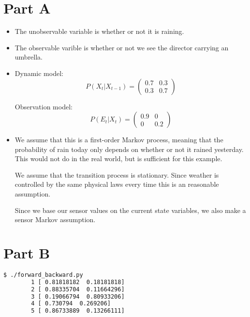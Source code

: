 \documentclass[a4paper]{article}
\date{}
\begin{document}
\thispagestyle{fancy}
    \section*{Part A}
        \begin{itemize}
            \item
                The unobservable variable is whether or not it is raining.
            \item
                The observable varible is whether or not we see the director carrying an umbrella.
            \item
                Dynamic model:
                \begin{equation}
                    P(X_t | X_{t-1}) = 
                    \begin{pmatrix}
                        0.7 & 0.3\\
                        0.3 & 0.7
                    \end{pmatrix}
                \end{equation}

                Observation model:
                \begin{equation}
                    P(E_t | X_t) = 
                    \begin{pmatrix}
                        0.9 & 0\\
                        0 & 0.2
                    \end{pmatrix}
                \end{equation}

            \item
                We assume that this is a first-order Markov process, meaning that the probability of
                rain today only depends on whether or not it rained yesterday. This would not do in
                the real world, but is sufficient for this example.

                We assume that the transition process is stationary. Since weather is controlled by the
                same physical laws every time this is an reasonable assumption.

                Since we base our sensor values on the current state variables, we also make a sensor
                Markov assumption.

        \end{itemize}
    \section*{Part B}
    \begin{lstlisting}[language=bash]
        $ ./forward_backward.py 
        1 [ 0.81818182  0.18181818]
        2 [ 0.88335704  0.11664296]
        3 [ 0.19066794  0.80933206]
        4 [ 0.730794  0.269206]
        5 [ 0.86733889  0.13266111]
    \end{lstlisting}
\end{document}
